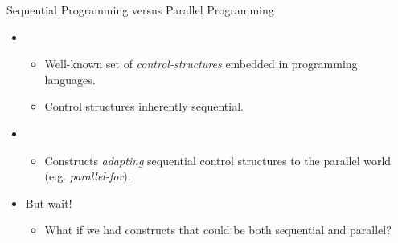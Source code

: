 \begin{frame}[t]{Sequential Programming versus Parallel Programming}
\begin{itemize}
\item {}
  \begin{itemize}
    \item Well-known set of \emph{control-structures} embedded in programming languages.
    \item Control structures inherently sequential.
  \end{itemize}
\vfill\pause
\item {}
  \begin{itemize}
    \item Constructs \emph{adapting} sequential control structures to the parallel world
          (e.g. \emph{parallel-for}).
  \end{itemize}
\vfill\pause
\item But wait!
  \begin{itemize}
    \item What if we had constructs that could be both sequential and parallel?
  \end{itemize}
\end{itemize}
\end{frame}
